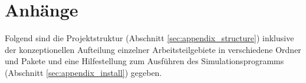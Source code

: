 

\renewcommand{\thechapter}{\Alph{chapter}}
\renewcommand{\thesection}{\Alph{section}}
\renewcommand{\thesubsection}{\Alph{section}.\arabic{subsection}}
\setcounter{section}{0} %

\chapter{Anhänge}\label{chapter:appendix}
Folgend sind die Projektstruktur (Abschnitt \ref{sec:appendix_structure}) inklusive der konzeptionellen Aufteilung einzelner Arbeitsteilgebiete in verschiedene Ordner und Pakete und eine Hilfestellung zum Ausführen des Simulationsprogramms (Abschnitt \ref{sec:appendix_install}) gegeben.\\ 




